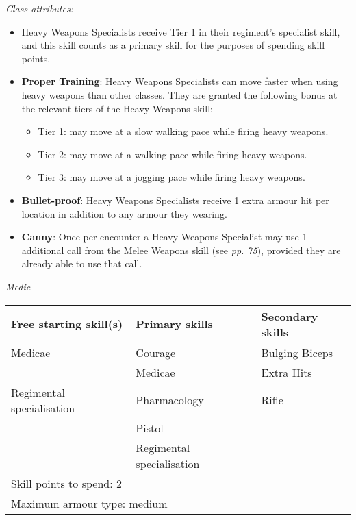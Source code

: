 \documentclass{scrbook}
\begin{document}
\textit{Class attributes:}

\begin{itemize}
\item Heavy Weapons Specialists receive Tier 1 in their regiment's specialist skill, and this skill counts as a primary skill for the purposes of spending skill points.

\item \textbf{Proper Training}: Heavy Weapons Specialists can move faster when using heavy weapons than other classes. They are granted the following bonus at the relevant tiers of the Heavy Weapons skill:

\begin{itemize}
\item Tier 1: may move at a slow walking pace while firing heavy weapons.

\item Tier 2: may move at a walking pace while firing heavy weapons.

\item Tier 3: may move at a jogging pace while firing heavy weapons.

\end{itemize}
\item \textbf{Bullet-proof}: Heavy Weapons Specialists receive 1 extra armour hit per location in addition to any armour they wearing.

\item \textbf{Canny}: Once per encounter a Heavy Weapons Specialist may use 1 additional call from the Melee Weapons skill (see \textit{pp. 75}), provided they are already able to use that call.

\end{itemize}
\textit{Medic}

\begin{table}
\begin{tabular}{|l|l|l|} \hline 
Free starting skill(s) & Primary skills & Secondary skills \\
 \hline Medicae & Courage & Bulging Biceps \\
 \hline  & Medicae & Extra Hits \\
 \hline Regimental specialisation & Pharmacology & Rifle \\
 \hline  & Pistol &  \\
 \hline  & Regimental specialisation &  \\
 \hline \multicolumn{3}{|l|}{Skill points to spend: 2} \\
 \hline \multicolumn{3}{|l|}{Maximum armour type: medium} \\
 \hline \end{tabular}

\end{table}
\end{document}
